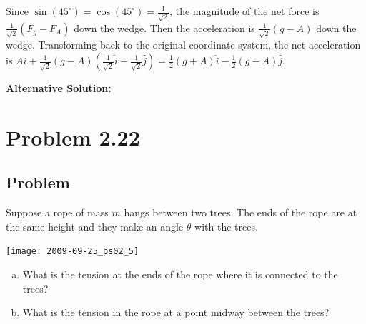\documentclass{esg8012pset}
\begin{document}
\begin{question}[Problem 2]
Since $\sin(45^{\circ}) = \cos(45^{\circ}) = \frac{1}{\sqrt{2}}$, the magnitude of the net force is $\frac{1}{\sqrt{2}}(F_g - F_A)$ down the wedge.  Then the acceleration is $\frac{1}{\sqrt{2}}(g - A)$ down the wedge.  Transforming back to the original coordinate system, the net acceleration is $A \hat i + \frac{1}{\sqrt{2}}(g - A)\left(\frac{1}{\sqrt{2}}\hat i - \frac{1}{\sqrt{2}} \hat j\right) = \frac{1}{2}(g + A) \hat i - \frac{1}{2}(g - A)\hat j$.


{\textbf{Alternative Solution:}}

\section*{Problem 2.22}
\subsection*{Problem} Suppose a rope of mass $m$ hangs between two trees. The ends of the rope are at the same height and they make an angle $\theta$ with the trees.
\begin{center}\texttt{[image: 2009-09-25\_ps02\_5]}\end{center}
\begin{enumerate}[a)]
  \item What is the tension at the ends of the rope where it is connected to the trees?
  \item What is the tension in the rope at a point midway between the trees?
\end{enumerate}

\end{question}
\end{document}
